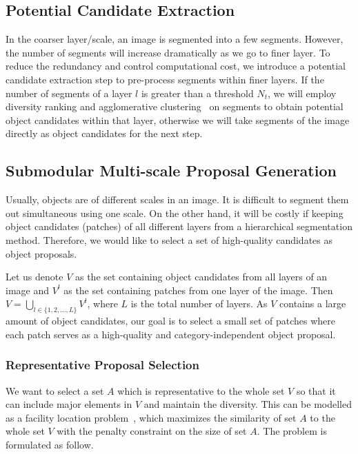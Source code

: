 \documentclass[10pt,twocolumn,letterpaper]{article}
\newcommand{\rk}[1]{{\color{blue}{#1}}}
\begin{document}
\subsection{Potential Candidate Extraction}
In the coarser layer/scale, an image is segmented into a few segments. However, the number of segments will increase dramatically as we go to finer layer. To reduce the redundancy and control computational cost, we introduce a potential candidate extraction step to pre-process segments within finer layers. If the number of segments of a layer $l$ is greater than a threshold $N_t$, we will employ diversity ranking and agglomerative clustering~\cite{Kim12CVPR} on segments to obtain potential object candidates within that layer, otherwise we will take segments of the image directly as object candidates for the next step. 


\subsection{Submodular Multi-scale Proposal Generation}
Usually, objects are of different scales in an image. It is difficult to segment them out simultaneous using one scale. On the other hand, it will be costly if keeping object candidates (patches) of all different layers from a hierarchical segmentation method. Therefore, we would like to select a set of high-quality candidates as object proposals. 

Let us denote $V$ as the set containing object candidates from all layers of an image and $V^l$ as the set containing patches from one layer of the image. Then $V = \bigcup_{l\in \{1,2,...,L\}} V^l$, where $L$ is the total number of layers. As $V$ contains a large amount of object candidates, our goal is to select a small set of patches where each patch serves as a high-quality and category-independent object proposal. 

\subsubsection{Representative Proposal Selection}
We want to select a set $A$ which is representative to the whole set $V$ so that it can include major elements in $V$ and maintain the diversity. This can be modelled as a facility location problem~\cite{Galvao04, Mirchandani90}, which maximizes the similarity of set $A$ to the whole set $V$ with the penalty constraint on the size of set $A$. The problem is formulated as follow. 
\end{document}
